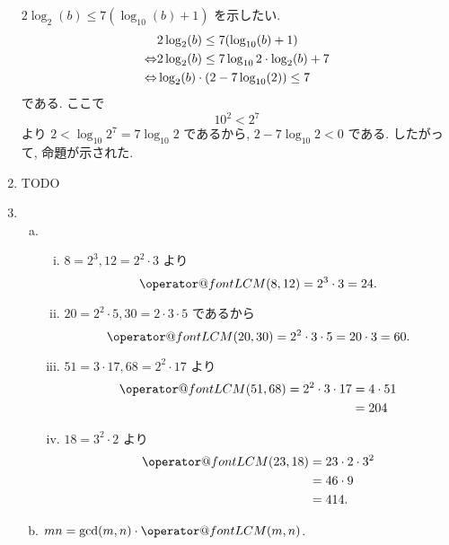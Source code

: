 \documentclass{jarticle}
\makeatletter
\def\LCM{\mathop{\operator@font LCM}}
\makeatother
\begin{document}
\begin{enumerate}[5.1]
$2 \log_2(b) \le 7(\log_{10}(b) + 1)$ を示したい.
\begin{align*}
  & 2\log_{2}(b) \le 7(\log_{10}(b) + 1) \\
  \Leftrightarrow & 2\log_2(b) \le 7\log_{10}2 \cdot \log_2(b) + 7 \\
  \Leftrightarrow & \log_2(b) \cdot (2 - 7\log_{10}(2)) \le 7
\end{align*}
である.
ここで
\[
  10^2 < 2^7
\]
より $2 < \log_{10}2^7 = 7\log_{10} 2$ であるから, $2 - 7\log_{10} 2 < 0$ である.
したがって, 命題が示された.
\item TODO
\item
\begin{enumerate}[(a)] %
\item
\begin{enumerate}[(i)] %
\item $8 = 2^3, 12 = 2^2 \cdot 3$ より
  \[
    \LCM(8, 12) = 2^3 \cdot 3 = 24.
  \]
\item $20 = 2^2 \cdot 5, 30 = 2 \cdot 3 \cdot 5$ であるから
  \[
    \LCM(20, 30) = 2^2 \cdot 3 \cdot 5 = 20 \cdot 3 = 60.
  \]
\item $51 = 3 \cdot 17, 68 = 2^2 \cdot 17$ より
  \begin{align*}
    \LCM(51, 68)
      = 2^2 \cdot 3 \cdot 17 &= 4 \cdot 51 \\
                             &= 204
  \end{align*}
\item $18 = 3^2 \cdot 2$ より
  \begin{align*}
    \LCM(23, 18)
      &= 23 \cdot 2 \cdot 3^2 \\
      &= 46 \cdot 9 \\
      &= 414.
  \end{align*}
\end{enumerate} %
\item
$mn = \gcd(m, n) \cdot \LCM(m, n)$.
\end{enumerate} %
\end{enumerate} %
\end{document}
